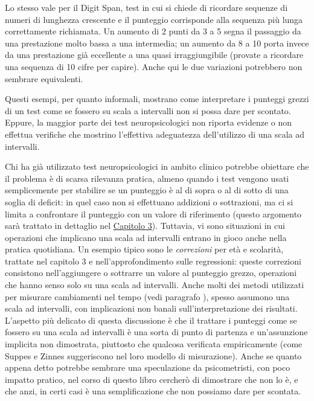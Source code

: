 \documentclass[
  italian,
  letterpaper,
  paper=6in:9in,
  pagesize=pdftex,
  headinclude=on,
  footinclude=on,
  11pt]{scrbook}
\begin{document}
Lo stesso vale per il Digit Span, test in cui si chiede di ricordare
sequenze di numeri di lunghezza crescente e il punteggio corrisponde
alla sequenza più lunga correttamente richiamata. Un aumento di 2 punti
da 3 a 5 segna il passaggio da una prestazione molto bassa a una
intermedia; un aumento da 8 a 10 porta invece da una prestazione già
eccellente a una quasi irraggiungibile (provate a ricordare una sequenza
di 10 cifre per capire). Anche qui le due variazioni potrebbero non
sembrare equivalenti.

Questi esempi, per quanto informali, mostrano come interpretare i
punteggi grezzi di un test come se fossero su scala a intervalli non si
possa dare per scontato. Eppure, la maggior parte dei test
neuropsicologici non riporta evidenze o non effettua verifiche che
mostrino l'effettiva adeguatezza dell'utilizzo di una scala ad
intervalli.

Chi ha già utilizzato test neuropsicologici in ambito clinico potrebbe
obiettare che il problema è di scarsa rilevanza pratica, almeno quando i
test vengono usati semplicemente per stabilire se un punteggio è al di
sopra o al di sotto di una soglia di deficit: in quel caso non si
effettuano addizioni o sottrazioni, ma ci si limita a confrontare il
punteggio con un valore di riferimento (questo argomento sarà trattato
in dettaglio nel \hyperref[Capitolo3]{Capitolo 3}). Tuttavia, vi sono
situazioni in cui operazioni che implicano una scala ad intervalli
entrano in gioco anche nella pratica quotidiana. Un esempio tipico sono
le \emph{correzioni} per età e scolarità, trattate nel capitolo 3 e
nell'approfondimento sulle regressioni: queste correzioni consistono
nell'aggiungere o sottrarre un valore al punteggio grezzo, operazioni
che hanno senso solo su una scala ad intervalli. Anche molti dei metodi
utilizzati per misurare cambiamenti nel tempo (vedi paragrafo ), spesso
assumono una scala ad intervalli, con implicazioni non banali
sull'interpretazione dei risultati. L'aspetto più delicato di questa
discussione è che il trattare i punteggi come se fossero su una scala ad
intervalli è una sorta di punto di partenza e un'assunzione implicita
non dimostrata, piuttosto che qualcosa verificata empiricamente (come
Suppes e Zinnes suggeriscono nel loro modello di misurazione). Anche se
quanto appena detto potrebbe sembrare una speculazione da psicometristi,
con poco impatto pratico, nel corso di questo libro cercherò di
dimostrare che non lo è, e che anzi, in certi casi è una semplificazione
che non possiamo dare per scontata.
\end{document}
